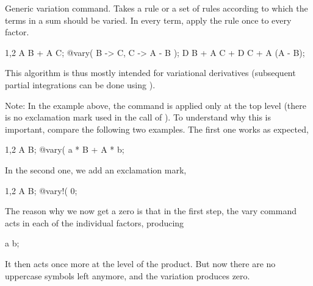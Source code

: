 
Generic variation command.  Takes a rule or a set of rules
according to which the terms in a sum should be varied. In every term,
apply the rule once to every factor.
\begin{screen}{1,2}
A B + A C;
@vary(%
          B -> \epsilon C,
          C -> \epsilon A - \epsilon B );
\epsilon D B + A \epsilon C + \epsilon D C 
                   + A (\epsilon A - \epsilon B);
\end{screen}
This algorithm is thus mostly intended for variational derivatives
(subsequent partial integrations can be done
using ).

Note: In the example above, the command is applied only at the top
level (there is no exclamation mark used in the call
of ). To understand why this is important, compare
the following two examples. The first one works as expected,
\begin{screen}{1,2}
A B;
@vary(%
a * B + A * b;
\end{screen}
In the second one, we add an exclamation mark,
\begin{screen}{1,2}
A B;
@vary!(%
0;
\end{screen}
The reason why we now get a zero is that in the first step, the vary
command acts in each of the individual factors, producing
\begin{screen}{0}
a b;
\end{screen}
It then acts once more at the level of the product. But now there are
no uppercase symbols left anymore, and the variation produces zero.


